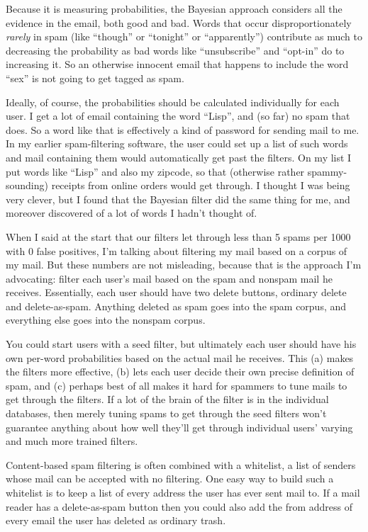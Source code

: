 Because it is measuring probabilities, the Bayesian approach considers
all the evidence in the email, both good and bad. Words that occur
disproportionately \emph{rarely} in spam (like ``though'' or ``tonight''
or ``apparently'') contribute as much to decreasing the probability as
bad words like ``unsubscribe'' and ``opt-in'' do to increasing it. So an
otherwise innocent email that happens to include the word ``sex'' is not
going to get tagged as spam.

Ideally, of course, the probabilities should be calculated individually
for each user. I get a lot of email containing the word ``Lisp'', and
(so far) no spam that does. So a word like that is effectively a kind of
password for sending mail to me. In my earlier spam-filtering software,
the user could set up a list of such words and mail containing them
would automatically get past the filters. On my list I put words like
``Lisp'' and also my zipcode, so that (otherwise rather spammy-sounding)
receipts from online orders would get through. I thought I was being
very clever, but I found that the Bayesian filter did the same thing for
me, and moreover discovered of a lot of words I hadn't thought of.

When I said at the start that our filters let through less than 5 spams
per 1000 with 0 false positives, I'm talking about filtering my mail
based on a corpus of my mail. But these numbers are not misleading,
because that is the approach I'm advocating: filter each user's mail
based on the spam and nonspam mail he receives. Essentially, each user
should have two delete buttons, ordinary delete and delete-as-spam.
Anything deleted as spam goes into the spam corpus, and everything else
goes into the nonspam corpus.

You could start users with a seed filter, but ultimately each user
should have his own per-word probabilities based on the actual mail he
receives. This (a) makes the filters more effective, (b) lets each user
decide their own precise definition of spam, and (c) perhaps best of all
makes it hard for spammers to tune mails to get through the filters. If
a lot of the brain of the filter is in the individual databases, then
merely tuning spams to get through the seed filters won't guarantee
anything about how well they'll get through individual users' varying
and much more trained filters.

Content-based spam filtering is often combined with a whitelist, a list
of senders whose mail can be accepted with no filtering. One easy way to
build such a whitelist is to keep a list of every address the user has
ever sent mail to. If a mail reader has a delete-as-spam button then you
could also add the from address of every email the user has deleted as
ordinary trash.

